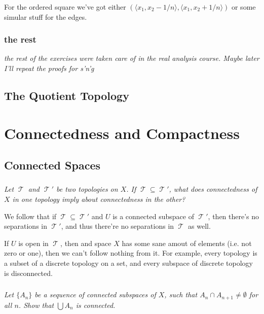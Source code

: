 \documentclass[11pt,oneside,titlepage]{book}
\DeclareMathOperator \topol {\mathcal {T}}
\newcommand{\eangle}[1]{\langle #1 \rangle}
\newcommand{\set}[1]{\{ #1 \}}
\begin{document}
For the ordered square we've got either $(\eangle{x_1, x_2 - 1/n}, \eangle{x_1, x_2 +  1/n})$
or some simular stuff for the edges.

\subsection*{the rest}

\textit{the rest of the exercises were taken care of in the real analysis course. Maybe later
  I'll repeat the proofs for s'n'g}

\section{The Quotient Topology}

\chapter{Connectedness and Compactness}

\section{Connected Spaces}

\subsection{}

\textit{Let $\topol$ and $\topol'$ be two topologies on $X$. If $\topol \subseteq \topol'$, what
  does connectedness of $X$ in one topology imply about connectedness in the other?}

We follow that if $\topol \subseteq \topol'$ and $U$ is a connected subspace of $\topol'$,
then there's no separations in $\topol'$, and thus there're no separations in $\topol$ as well.

If $U$ is open in $\topol$, then and space $X$ has some sane amout of elements (i.e. not zero or
one), then we can't follow nothing from it. For example, every topology is a subset
of a discrete topology on a set, and every subspace of discrete topology is disconnected.

\subsection{}

\textit{Let $\set{A_n}$ be a sequence of connected subspaces of $X$, such that
  $A_n \cap A_{n + 1} \neq \emptyset$ for all $n$. Show that $\bigcup{A_n}$ is connected.}
\end{document}
